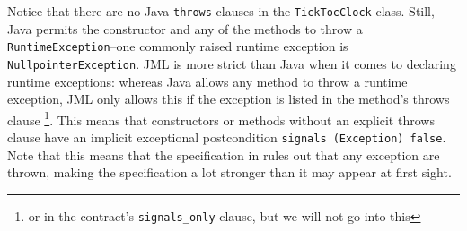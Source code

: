 \documentclass{llncs}
\begin{document}
%
%
%

Notice that there are no Java \texttt{throws} clauses in the \texttt{TickTocClock} 
class.  Still, Java permits the constructor and any of the methods to throw a 
\texttt{RuntimeException}--one commonly raised runtime exception is 
\texttt{NullpointerException}.
%
JML is more strict than Java when it comes to declaring runtime exceptions: 
whereas Java allows any method to throw a runtime exception, JML only 
allows this if the exception is listed in the method's throws clause
\footnote{or in the contract's \texttt{signals\_only} clause, but we will not go 
into this}.
This means that constructors or methods without an explicit throws clause
have an implicit exceptional postcondition \texttt{signals (Exception) false}.
Note that this means that the specification in  
rules out that any exception are thrown, making the specification a lot stronger 
than it may appear at first sight.
\end{document}
